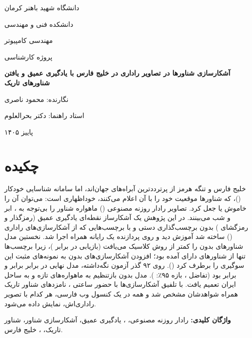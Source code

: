 \documentclass[12pt,a4paper,oneside]{report}
\begin{document}
\begin{titlepage}
\centering
\vspace*{2cm}
{\large دانشگاه شهید باهنر کرمان\par}
\vspace{1.5cm}
{\large دانشکده فنی و مهندسی\par}
\vspace{1.5cm}
{\large مهندسی کامپیوتر\par}
\vspace{1.5cm}
{\large پروژه کارشناسی\par}
\vspace{1.5cm}
{\LARGE\bfseries آشکارسازی شناورها در تصاویر راداری  در خلیج فارس با یادگیری عمیق و یافتن شناورهای تاریک\par}
\vspace{2cm}
{\large نگارنده: محمود ناصری\par}
\vspace{0.5cm}
{\large استاد راهنما: دکتر بحرالعلوم\par}
\vfill
{\large پاییز ۱۴۰۵\par}
\end{titlepage}

\chapter*{چکیده}
خلیج فارس و تنگه هرمز از پرترددترین آبراه‌های جهان‌اند، اما سامانه شناسایی خودکار
()، که شناورها موقعیت خود را با آن اعلام می‌کنند، خوداظهاری است: می‌توان آن را
خاموش یا جعل کرد. تصاویر رادار روزنه مصنوعی () ماهواره  شناور را
بی‌توجه به ، ابر و شب می‌بینند. در این پژوهش یک آشکارساز نقطه‌ای یادگیری عمیق
(رمزگذار  و رمزگشای ) بدون برچسب‌گذاری دستی و با برچسب‌هایی
که از آشکارسازی‌های راداری  () ساخته شد آموزش دید و روی
پردازنده یک رایانه همراه اجرا شد. نخستین مدل شناورهای بدون  را کمتر از روش کلاسیک
 می‌یافت (بازیابی \darkRecallRunOne{} در برابر \darkRecallCfar)، زیرا برچسب‌ها تنها
از شناورهای دارای  آمده بود؛ افزودن آشکارسازی‌های بدون  به نمونه‌های مثبت
این سوگیری را برطرف کرد (\darkRecallModel). روی ۹۲ گذر آزمون نگه‌داشته،  مدل نهایی
در برابر  برابر \testFOneModel{} و  برابر \testFOneCfar{} بود (تفاضل
\testDiff، بازه ۹۵٪: \testDiffCi). مدل بدون بازتنظیم به ماهواره‌های تازه 
و به ساحل ایران تعمیم یافت. با تلفیق آشکارسازی‌ها با حضور ساعتی ، نامزدهای شناور
تاریک همراه شواهدشان مشخص شد و همه در یک کنسول وب فارسی، هر کدام با تصویر راداری‌اش،
نمایش داده می‌شود.

\noindent\textbf{واژگان کلیدی:} رادار روزنه مصنوعی، ، یادگیری عمیق،
آشکارسازی شناور، شناور تاریک، ، خلیج فارس.

\tableofcontents
\listoftables
\listoffigures
\cleardoublepage
{}








\end{document}
